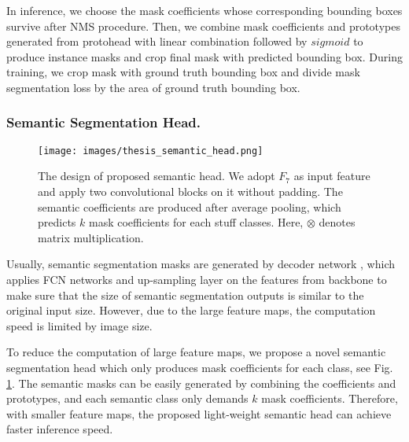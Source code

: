 \documentclass[runningheads]{llncs}
\begin{document}
In inference, we choose the mask coefficients whose corresponding bounding boxes survive after NMS procedure. Then, we combine mask coefficients and prototypes  generated from protohead with linear combination followed by $sigmoid$ to produce instance masks and crop final mask with predicted bounding box. During training, we crop mask with ground truth bounding box and divide mask segmentation loss by the area of ground truth bounding box.

\subsubsection{Semantic Segmentation Head.}

\begin{figure}[!tb]
\centering
\texttt{[image: images/thesis\_semantic\_head.png]}
\caption{The design of proposed semantic head. We adopt $F_7$ as input feature and apply two convolutional blocks on it without padding. The semantic coefficients are produced after average pooling, which predicts $k$ mask coefficients for each stuff classes. Here, $\otimes$ denotes matrix multiplication. }
\label{fig:sem_head}
\end{figure}

Usually, semantic segmentation masks are generated by decoder network \cite{Lin2017a,Zhang2018,Zhao2016,Long2015}, which applies FCN \cite{Long2015} networks and up-sampling layer on the features from backbone to make sure that the size of semantic segmentation outputs is similar to the original input size. However, due to the large feature maps, the computation speed is limited by image size.

To reduce the computation of large feature maps, we propose a novel semantic segmentation head which only produces mask coefficients for each class, see Fig. \ref{fig:sem_head}. The semantic masks can be easily generated by combining the coefficients and prototypes, and each semantic class only demands $k$ mask coefficients. Therefore, with smaller feature maps, the proposed light-weight semantic head can achieve faster inference speed.
\end{document}
